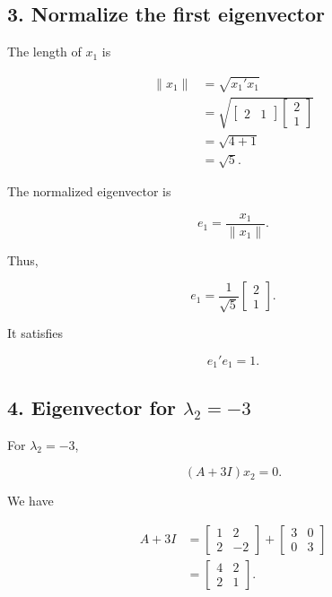 \documentclass[12pt]{article}
\begin{document}
	\subsection*{3. Normalize the first eigenvector}
	
	The length of $x_1$ is
	
	\[
	\begin{aligned}
		\|x_1\|
		&=\sqrt{x_1'x_1}\\
		&=
		\sqrt{
			\begin{bmatrix}
				2&1
			\end{bmatrix}
			\begin{bmatrix}
				2\\
				1
			\end{bmatrix}
		}\\
		&=\sqrt{4+1}\\
		&=\sqrt{5}.
	\end{aligned}
	\]
	
	The normalized eigenvector is
	
	\[
	e_1=\frac{x_1}{\|x_1\|}.
	\]
	
	Thus,
	
	\[
	\boxed{
		e_1=
		\frac{1}{\sqrt{5}}
		\begin{bmatrix}
			2\\
			1
		\end{bmatrix}
	}.
	\]
	
	It satisfies
	
	\[
	e_1'e_1=1.
	\]
	
	\subsection*{4. Eigenvector for $\lambda_2=-3$}
	
	For $\lambda_2=-3$,
	
	\[
	(A+3I)x_2=0.
	\]
	
	We have
	
	\[
	\begin{aligned}
		A+3I
		&=
		\begin{bmatrix}
			1&2\\
			2&-2
		\end{bmatrix}
		+
		\begin{bmatrix}
			3&0\\
			0&3
		\end{bmatrix}\\
		&=
		\begin{bmatrix}
			4&2\\
			2&1
		\end{bmatrix}.
	\end{aligned}
	\]
	
\end{document}
